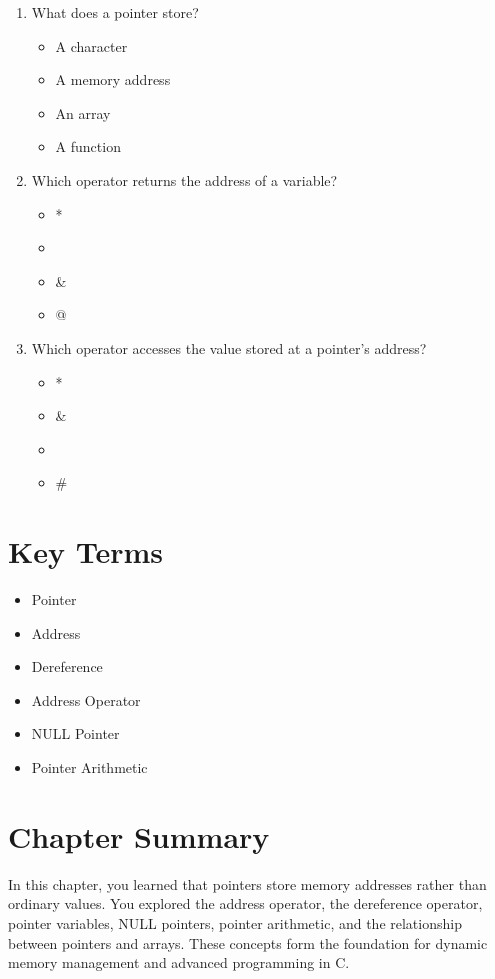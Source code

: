 \documentclass[12pt,openany]{book}
\begin{document}
\begin{enumerate}
    \item What does a pointer store?
    \begin{itemize}
        \item A character
        \item A memory address
        \item An array
        \item A function
    \end{itemize}

    \item Which operator returns the address of a variable?
    \begin{itemize}
        \item *
        \item %
        \item &
        \item @
    \end{itemize}

    \item Which operator accesses the value stored at a pointer's address?
    \begin{itemize}
        \item *
        \item &
        \item %
        \item #
    \end{itemize}
\end{enumerate}

\section{Key Terms}

\begin{itemize}
    \item Pointer
    \item Address
    \item Dereference
    \item Address Operator
    \item NULL Pointer
    \item Pointer Arithmetic
\end{itemize}

\section{Chapter Summary}

In this chapter, you learned that pointers store memory addresses rather than ordinary values. You explored the address operator, the dereference operator, pointer variables, NULL pointers, pointer arithmetic, and the relationship between pointers and arrays. These concepts form the foundation for dynamic memory management and advanced programming in C.
\end{document}
